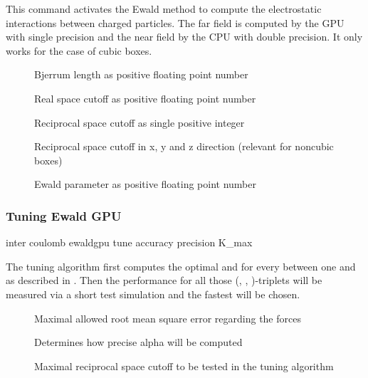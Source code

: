 This command activates the Ewald method to compute the electrostatic
interactions between charged particles.  The far field is computed by the GPU with single precision and the near field by the CPU with double precision. It only works for the case of cubic boxes.
\begin{description}
\item[] Bjerrum length as positive floating point number
\item[] Real space cutoff as positive floating point number
\item[] Reciprocal space cutoff as single positive integer
\item[] Reciprocal space cutoff in x, y and z direction  (relevant for noncubic boxes)
\item[] Ewald parameter as positive floating point number
\end{description}

\subsubsection{Tuning Ewald GPU}
\label{ssec:tuneewaldgpu}
\begin{essyntax}
  inter coulomb  ewaldgpu tune
  accuracy  precision 
  K_max 
  \begin{features}
  \end{features}
\end{essyntax}

The tuning algorithm first computes the optimal  and  for every  between one and  as described in \cite{kolafa92}. Then the performance for all those (, , )-triplets will be measured via a short test simulation and the fastest will be chosen. 

\begin{description}
\item[] Maximal allowed root mean square error regarding the forces
\item[] Determines how precise alpha will be computed
\item[] Maximal reciprocal space cutoff  to be tested in the tuning algorithm
\end{description}

